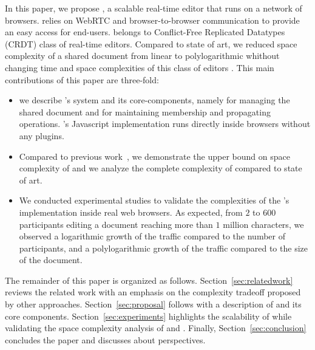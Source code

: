 In this paper, we propose \CRATE, a scalable real-time editor that
runs on a network of browsers. \CRATE relies on WebRTC and
browser-to-browser communication to provide an easy access for
end-users. \CRATE belongs to Conflict-Free Replicated Datatypes (CRDT)
class of real-time editors. Compared to state of art, we reduced space
complexity of a shared document from linear to polylogarithmic
whithout changing time and space complexities of this class of editors
. This main contributions of this paper are three-fold:
\begin{itemize}
\item we describe \CRATE's system and its core-components, namely
  \LSEQ for managing the shared document and \SPRAY for maintaining
  membership and propagating operations. \CRATE's Javascript
  implementation runs directly inside browsers without any plugins.
\item Compared to previous work~\cite{nedelec2013lseq}, we demonstrate the upper
  bound on space complexity of \LSEQ and we analyze the complete complexity of
  \CRATE compared to state of art.
\item We conducted experimental studies to validate the complexities of the
  \CRATE's implementation inside real web browsers. As expected, from $2$ to $600$
  participants editing a document reaching more than $1$ million characters, we
  observed a logarithmic growth of the traffic compared to the number of
  participants, and a polylogarithmic growth of the traffic compared to the size
  of the document.
\end{itemize}

The remainder of this paper is organized as
follows. Section~\ref{sec:relatedwork} reviews the related work with an emphasis
on the complexity tradeoff proposed by other
approaches. Section~\ref{sec:proposal} follows with a description of \CRATE and
its core components. Section~\ref{sec:experiments} highlights the scalability of
\CRATE while validating the space complexity analysis of \LSEQ and
\SPRAY. Finally, Section~\ref{sec:conclusion} concludes the paper and discusses
about perspectives.

